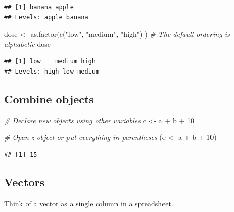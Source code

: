 \documentclass[
]{book}
\newenvironment{Shaded}{\begin{snugshade}}{\end{snugshade}}
\newcommand{\CommentTok}[1]{\textcolor[rgb]{0.56,0.35,0.01}{\textit{#1}}}
\newcommand{\DecValTok}[1]{\textcolor[rgb]{0.00,0.00,0.81}{#1}}
\newcommand{\FunctionTok}[1]{\textcolor[rgb]{0.00,0.00,0.00}{#1}}
\newcommand{\NormalTok}[1]{#1}
\newcommand{\OtherTok}[1]{\textcolor[rgb]{0.56,0.35,0.01}{#1}}
\newcommand{\SpecialCharTok}[1]{\textcolor[rgb]{0.00,0.00,0.00}{#1}}
\newcommand{\StringTok}[1]{\textcolor[rgb]{0.31,0.60,0.02}{#1}}
\begin{document}
\begin{verbatim}
## [1] banana apple 
## Levels: apple banana
\end{verbatim}

\begin{Shaded}
\begin{Highlighting}[]
\NormalTok{dose }\OtherTok{\textless{}{-}} \FunctionTok{as.factor}\NormalTok{(}\FunctionTok{c}\NormalTok{(}\StringTok{"low"}\NormalTok{, }\StringTok{"medium"}\NormalTok{, }\StringTok{"high"}\NormalTok{)  ) }\CommentTok{\# The default ordering is alphabetic}
\NormalTok{dose}
\end{Highlighting}
\end{Shaded}

\begin{verbatim}
## [1] low    medium high  
## Levels: high low medium
\end{verbatim}

\hypertarget{combine-objects}{%
\subsection*{Combine objects}\label{combine-objects}}

\begin{Shaded}
\begin{Highlighting}[]
\CommentTok{\# Declare new objects using other variables}
\NormalTok{c }\OtherTok{\textless{}{-}}\NormalTok{ a }\SpecialCharTok{+}\NormalTok{ b }\SpecialCharTok{+} \DecValTok{10}

\CommentTok{\# Open z object or put everything in parentheses}
\NormalTok{(c }\OtherTok{\textless{}{-}}\NormalTok{ a }\SpecialCharTok{+}\NormalTok{ b }\SpecialCharTok{+} \DecValTok{10}\NormalTok{)}
\end{Highlighting}
\end{Shaded}

\begin{verbatim}
## [1] 15
\end{verbatim}

\hypertarget{vectors}{%
\subsection*{Vectors}\label{vectors}}

Think of a vector as a single column in a spreadsheet.
\end{document}
